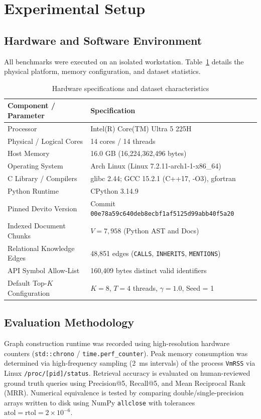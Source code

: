 \documentclass[conference]{IEEEtran}
\begin{document}
\section{Experimental Setup}
\subsection{Hardware and Software Environment}
All benchmarks were executed on an isolated workstation. Table~\ref{tab:hardware} details the physical platform, memory configuration, and dataset statistics.

\begin{table}[!t]
\caption{Hardware specifications and dataset characteristics}
\label{tab:hardware}\centering\footnotesize
\setlength{\tabcolsep}{4pt}
\begin{tabularx}{\columnwidth}{lX}\toprule
Component / Parameter & Specification \\ \midrule
Processor & Intel(R) Core(TM) Ultra 5 225H \\
Physical / Logical Cores & 14 cores / 14 threads \\
Host Memory & 16.0 GB (16,224,362,496 bytes) \\
Operating System & Arch Linux (Linux 7.2.11-arch1-1-x86\_64) \\
C Library / Compilers & glibc 2.44; GCC 15.2.1 (C++17, -O3), gfortran \\
Python Runtime & CPython 3.14.9 \\
Pinned Devito Version & Commit \texttt{00e78a59c640deb8ecbf1af5125d99abb40f5a20} \\
Indexed Document Chunks & $V = 7,958$ (Python AST and Docs) \\
Relational Knowledge Edges & 48,851 edges (\texttt{CALLS}, \texttt{INHERITS}, \texttt{MENTIONS}) \\
API Symbol Allow-List & 160,409 bytes distinct valid identifiers \\
Default Top-$K$ Configuration & $K = 8$, $T = 4$ threads, $\gamma = 1.0$, Seed = 1 \\
\bottomrule\end{tabularx}
\end{table}

\subsection{Evaluation Methodology}
Graph construction runtime was recorded using high-resolution hardware counters (\texttt{std::chrono} / \texttt{time.perf\_counter}). Peak memory consumption was determined via high-frequency sampling (2~ms intervals) of the process \texttt{VmRSS} via Linux \texttt{/proc/[pid]/status}. Retrieval accuracy is evaluated on human-reviewed ground truth queries using Precision@5, Recall@5, and Mean Reciprocal Rank (MRR). Numerical equivalence is tested by comparing double/single-precision arrays written to disk using NumPy \texttt{allclose} with tolerances $\mathrm{atol} = \mathrm{rtol} = 2\times 10^{-6}$.
\end{document}
